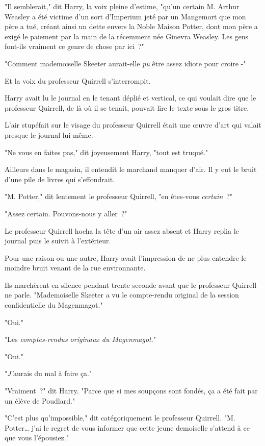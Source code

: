 "Il semblerait," dit Harry, la voix pleine d'estime, "qu'un certain M. Arthur Weasley a été victime d'un sort d'Imperium jeté par un Mangemort que mon père a tué, créant ainsi un dette envers la Noble Maison Potter, dont mon père a exigé le paiement par la main de la récemment née Ginevra Weasley. Les gens font-ils vraiment ce genre de chose par ici~?"

"Comment mademoiselle Skeeter aurait-elle \emph{pu} être assez idiote pour croire -"

Et la voix du professeur Quirrell s'interrompit.

Harry avait lu le journal en le tenant déplié et vertical, ce qui voulait dire que le professeur Quirrell, de là où il se tenait, pouvait lire le texte sous le gros titre.

L'air stupéfait sur le visage du professeur Quirrell était une œuvre d'art qui valait presque le journal lui-même.

"Ne vous en faites pas," dit joyeusement Harry, "tout est truqué."

Ailleurs dans le magasin, il entendit le marchand manquer d'air. Il y eut le bruit d'une pile de livres qui s'effondrait.

"M. Potter," dit lentement le professeur Quirrell, "en êtes-vous \emph{certain}~?"

"Assez certain. Pouvons-nous y aller~?"

Le professeur Quirrell hocha la tête d'un air assez absent et Harry replia le journal puis le suivit à l'extérieur.

Pour une raison ou une autre, Harry avait l'impression de ne plus entendre le moindre bruit venant de la rue environnante.

Ils marchèrent en silence pendant trente seconde avant que le professeur Quirrell ne parle. "Mademoiselle Skeeter a vu le compte-rendu original de la session confidentielle du Magenmagot."

"Oui."

"Les \emph{comptes-rendus originaux du Magenmagot}."

"Oui."

"\emph{J'}aurais du mal à faire ça."

"Vraiment~?" dit Harry. "Parce que si mes soupçons sont fondés, ça a été fait par un élève de Poudlard."

"C'est plus qu'impossible," dit catégoriquement le professeur Quirrell. "M. Potter… j'ai le regret de vous informer que cette jeune demoiselle s'attend à ce que vous l'épousiez."

